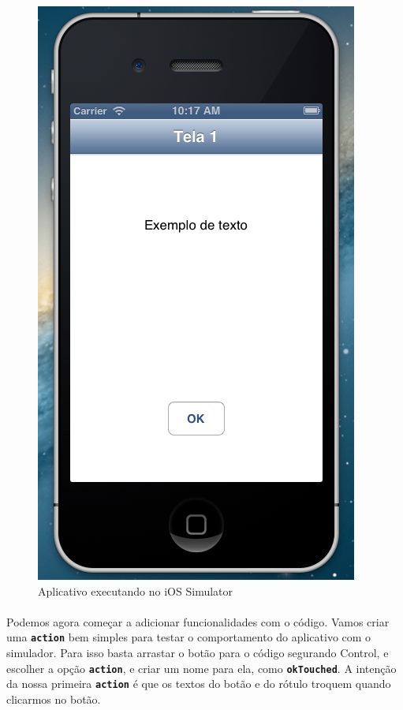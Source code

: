 \documentclass[a4paper,12pt,brazil,doubleside]{book}
\begin{document}
\begin{figure}[h]
  \centering
  \includegraphics[totalheight=0.5\textheight]{figuras/1/simulador1_tela1.png}
  \caption{Aplicativo executando no iOS Simulator}
  \label{fig:a}
\end{figure}

\paragraph{}Podemos agora começar a adicionar funcionalidades com o código. Vamos criar uma \texttt{\textbf{action}} bem simples para testar o comportamento do aplicativo com o simulador. Para isso basta arrastar o botão para o código segurando Control, e escolher a opção \texttt{\textbf{action}}, e criar um nome para ela, como \texttt{\textbf{okTouched}}. A intenção da nossa primeira \texttt{\textbf{action}} é que os textos do botão e do rótulo troquem quando clicarmos no botão.
\end{document}
